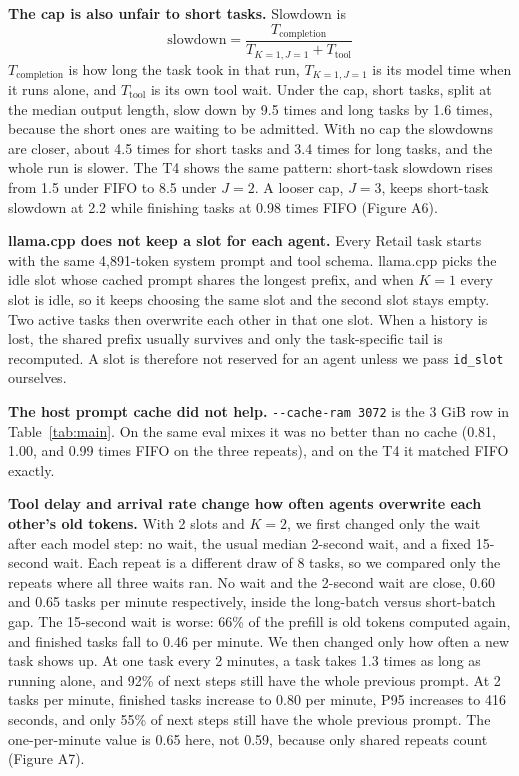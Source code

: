 \documentclass[9pt,twocolumn]{extarticle}
\begin{document}
\textbf{The cap is also unfair to short tasks.} Slowdown is
\begin{equation}
\mathrm{slowdown} = \frac{T_{\mathrm{completion}}}{T_{K=1,J=1} + T_{\mathrm{tool}}}
\end{equation}
\(T_{\mathrm{completion}}\) is how long the task took in that run, \(T_{K=1,J=1}\) is its model time when it runs alone, and \(T_{\mathrm{tool}}\) is its own tool wait. Under the cap, short tasks, split at the median output length, slow down by 9.5 times and long tasks by 1.6 times, because the short ones are waiting to be admitted. With no cap the slowdowns are closer, about 4.5 times for short tasks and 3.4 times for long tasks, and the whole run is slower. The T4 shows the same pattern: short-task slowdown rises from 1.5 under FIFO to 8.5 under $J = 2$. A looser cap, $J = 3$, keeps short-task slowdown at 2.2 while finishing tasks at 0.98 times FIFO (Figure A6).

\textbf{llama.cpp does not keep a slot for each agent.} Every Retail task starts with the same 4,891-token system prompt and tool schema. llama.cpp picks the idle slot whose cached prompt shares the longest prefix, and when $K = 1$ every slot is idle, so it keeps choosing the same slot and the second slot stays empty. Two active tasks then overwrite each other in that one slot. When a history is lost, the shared prefix usually survives and only the task-specific tail is recomputed. A slot is therefore not reserved for an agent unless we pass \texttt{id\_slot} ourselves.

\textbf{The host prompt cache did not help.} \texttt{-{}-cache-ram 3072} is the 3 GiB row in Table~\ref{tab:main}. On the same eval mixes it was no better than no cache (0.81, 1.00, and 0.99 times FIFO on the three repeats), and on the T4 it matched FIFO exactly.

\textbf{Tool delay and arrival rate change how often agents overwrite each other's old tokens.} With 2 slots and $K = 2$, we first changed only the wait after each model step: no wait, the usual median 2-second wait, and a fixed 15-second wait. Each repeat is a different draw of 8 tasks, so we compared only the repeats where all three waits ran. No wait and the 2-second wait are close, 0.60 and 0.65 tasks per minute respectively, inside the long-batch versus short-batch gap. The 15-second wait is worse: 66\% of the prefill is old tokens computed again, and finished tasks fall to 0.46 per minute. We then changed only how often a new task shows up. At one task every 2 minutes, a task takes 1.3 times as long as running alone, and 92\% of next steps still have the whole previous prompt. At 2 tasks per minute, finished tasks increase to 0.80 per minute, P95 increases to 416 seconds, and only 55\% of next steps still have the whole previous prompt. The one-per-minute value is 0.65 here, not 0.59, because only shared repeats count (Figure A7).
\end{document}

